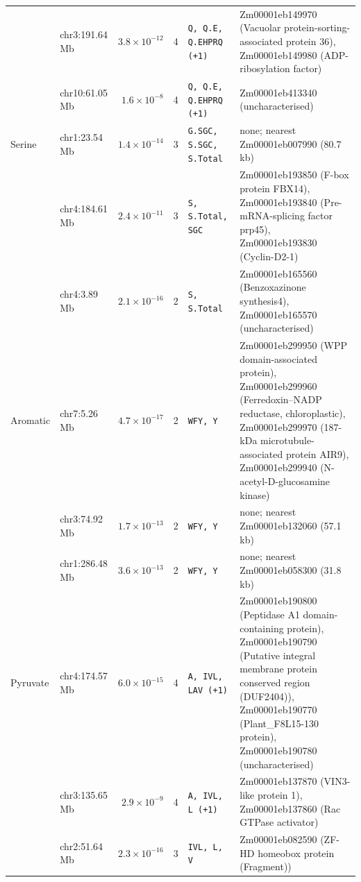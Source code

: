 \begin{table}[t]
\begin{tabularx}{\textwidth}{@{}l l r r l >{\raggedright\arraybackslash}X@{}}
 & chr3:191.64 Mb & $3.8\times10^{-12}$ & 4 & \texttt{Q, Q.E, Q.EHPRQ (+1)} & Zm00001eb149970 (Vacuolar protein-sorting-associated protein 36), Zm00001eb149980 (ADP-ribosylation factor) \\
 & chr10:61.05 Mb & $1.6\times10^{-8}$ & 4 & \texttt{Q, Q.E, Q.EHPRQ (+1)} & Zm00001eb413340 (uncharacterised) \\
\hline
Serine & chr1:23.54 Mb & $1.4\times10^{-14}$ & 3 & \texttt{G.SGC, S.SGC, S.Total} & none; nearest Zm00001eb007990 (80.7 kb) \\
 & chr4:184.61 Mb & $2.4\times10^{-11}$ & 3 & \texttt{S, S.Total, SGC} & Zm00001eb193850 (F-box protein FBX14), Zm00001eb193840 (Pre-mRNA-splicing factor prp45), Zm00001eb193830 (Cyclin-D2-1) \\
 & chr4:3.89 Mb & $2.1\times10^{-16}$ & 2 & \texttt{S, S.Total} & Zm00001eb165560 (Benzoxazinone synthesis4), Zm00001eb165570 (uncharacterised) \\
\hline
Aromatic & chr7:5.26 Mb & $4.7\times10^{-17}$ & 2 & \texttt{WFY, Y} & Zm00001eb299950 (WPP domain-associated protein), Zm00001eb299960 (Ferredoxin--NADP reductase, chloroplastic), Zm00001eb299970 (187-kDa microtubule-associated protein AIR9), Zm00001eb299940 (N-acetyl-D-glucosamine kinase) \\
 & chr3:74.92 Mb & $1.7\times10^{-13}$ & 2 & \texttt{WFY, Y} & none; nearest Zm00001eb132060 (57.1 kb) \\
 & chr1:286.48 Mb & $3.6\times10^{-13}$ & 2 & \texttt{WFY, Y} & none; nearest Zm00001eb058300 (31.8 kb) \\
\hline
Pyruvate & chr4:174.57 Mb & $6.0\times10^{-15}$ & 4 & \texttt{A, IVL, LAV (+1)} & Zm00001eb190800 (Peptidase A1 domain-containing protein), Zm00001eb190790 (Putative integral membrane protein conserved region (DUF2404)), Zm00001eb190770 (Plant\_F8L15-130 protein), Zm00001eb190780 (uncharacterised) \\
 & chr3:135.65 Mb & $2.9\times10^{-9}$ & 4 & \texttt{A, IVL, L (+1)} & Zm00001eb137870 (VIN3-like protein 1), Zm00001eb137860 (Rac GTPase activator) \\
 & chr2:51.64 Mb & $2.3\times10^{-16}$ & 3 & \texttt{IVL, L, V} & Zm00001eb082590 (ZF-HD homeobox protein (Fragment)) \\
\hline
\end{tabularx}
\end{table}
